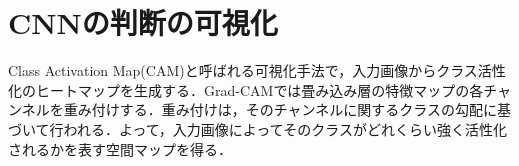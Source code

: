 \section{CNNの判断の可視化}
Class Activation Map(CAM)と呼ばれる可視化手法で，入力画像からクラス活性化のヒートマップを生成する．Grad-CAM\cite{grad-cam}では畳み込み層の特徴マップの各チャンネルを重み付けする．重み付けは，そのチャンネルに関するクラスの勾配に基づいて行われる．よって，入力画像によってそのクラスがどれくらい強く活性化されるかを表す空間マップを得る．